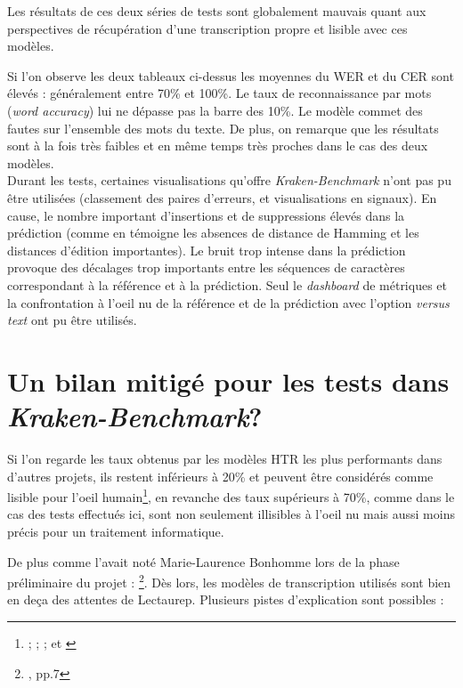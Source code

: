 Les résultats de ces deux séries de tests sont globalement mauvais quant aux perspectives de récupération d'une transcription propre et lisible avec ces modèles. 

Si l'on observe les deux tableaux ci-dessus les moyennes du WER et du CER sont élevés : généralement entre 70\% et 100\%. Le taux de reconnaissance par mots (\textit{word accuracy}) lui ne dépasse pas la barre des 10\%. Le modèle commet des fautes sur l'ensemble des mots du texte. De plus, on remarque que les résultats sont à la fois très faibles et en même temps très proches dans le cas des deux modèles.\\

Durant les tests, certaines visualisations qu'offre \textit{Kraken-Benchmark} n'ont pas pu être utilisées (classement des paires d'erreurs, et visualisations en signaux). En cause, le nombre important d'insertions et de suppressions élevés dans la prédiction (comme en témoigne les absences de distance de Hamming et les distances d'édition importantes). Le bruit trop intense dans la prédiction provoque des décalages trop importants entre les séquences de caractères correspondant à la référence et à la prédiction. Seul le \textit{dashboard} de métriques et la confrontation à l'oeil nu de la référence et de la prédiction avec l'option \textit{versus text} ont pu être utilisés. 

\section{Un bilan mitigé pour les tests dans\\ \textit{Kraken-Benchmark}?}

Si l'on regarde les taux obtenus par les modèles HTR les plus performants dans d'autres projets, ils restent inférieurs à 20\% et peuvent être considérés comme lisible pour l'oeil humain\footnote{\cite{barrere_results_2018};  \cite{pratikakis_icfhr_2018}; \cite{olver_machine_2017}; \cite{ares_oliveira_comparing_2018} et \cite{lavrenko_holistic_2004}}, en revanche des taux supérieurs à 70\%, comme dans le cas des tests effectués ici, sont non seulement illisibles à l'oeil nu mais aussi moins précis pour un traitement informatique. 

De plus comme l'avait noté Marie-Laurence Bonhomme lors de la phase préliminaire du projet : \footnote{\cite{bonhomme_defis_2018}, pp.7}. Dès lors, les modèles de transcription utilisés sont bien en deça des attentes de Lectaurep. Plusieurs pistes d'explication sont possibles :
\newpage


